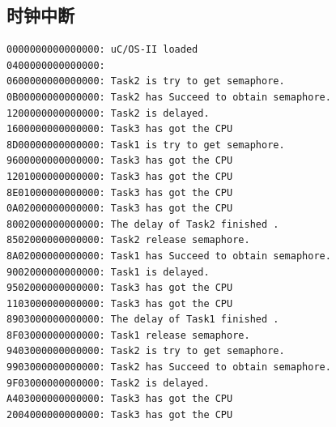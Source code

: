\documentclass{ctexart}
\begin{document}
    \subsection{时钟中断}
    \begin{lstlisting}[language={}]
0000000000000000: uC/OS-II loaded
0400000000000000:
0600000000000000: Task2 is try to get semaphore.
0B00000000000000: Task2 has Succeed to obtain semaphore.
1200000000000000: Task2 is delayed.
1600000000000000: Task3 has got the CPU
8D00000000000000: Task1 is try to get semaphore.
9600000000000000: Task3 has got the CPU
1201000000000000: Task3 has got the CPU
8E01000000000000: Task3 has got the CPU
0A02000000000000: Task3 has got the CPU
8002000000000000: The delay of Task2 finished .
8502000000000000: Task2 release semaphore.
8A02000000000000: Task1 has Succeed to obtain semaphore.
9002000000000000: Task1 is delayed.
9502000000000000: Task3 has got the CPU
1103000000000000: Task3 has got the CPU
8903000000000000: The delay of Task1 finished .
8F03000000000000: Task1 release semaphore.
9403000000000000: Task2 is try to get semaphore.
9903000000000000: Task2 has Succeed to obtain semaphore.
9F03000000000000: Task2 is delayed.
A403000000000000: Task3 has got the CPU
2004000000000000: Task3 has got the CPU

    \end{lstlisting}
\end{document}

